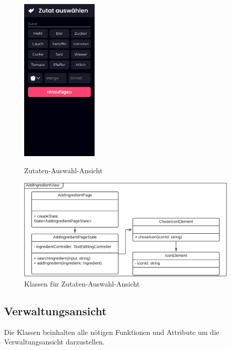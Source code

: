 \documentclass{entwurfsheft}
\begin{document}
        \begin{figure}[htp]
            \begin{minipage}
                [t]{0.49\textwidth}
                \centering
                \includegraphics[height=80mm]{images/Presentation-layer/IngredientPickerView.jpg}
                \caption{Zutaten-Auswahl-Ansicht}
            \end{minipage}
            \begin{minipage}
                [t]{0.49\textwidth}
                \centering
                \includegraphics[width=0.95\textwidth]{images/Presentation-layer/IngredientPickerViewClass.pdf}
                \caption{Klassen für Zutaten-Auswahl-Ansicht}
            \end{minipage}
        \end{figure} 
            
        \newpage

\subsection{Verwaltungsansicht}
    Die Klassen beinhalten alle nötigen Funktionen und Attribute um die Verwaltungsansicht darzustellen.
\end{document}
